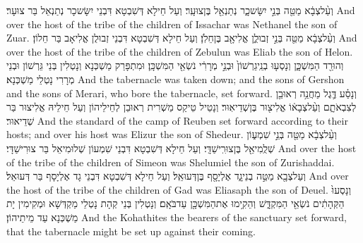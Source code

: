 {וְעַ֨ל\maqqaf צְבָ֔א מַטֵּ֖ה בְּנֵ֣י יִשָּׂשכָ֑ר נְתַנְאֵ֖ל בֶּן\maqqaf צוּעָֽר׃}
{וְעַל חֵילָא דְּשִׁבְטָא דִּבְנֵי יִשָּׂשכָר נְתַנְאֵל בַּר צוּעָר׃}
{And over the host of the tribe of the children of Issachar was Nethanel the son of Zuar.}{}
{וְעַ֨ל\maqqaf צְבָ֔א מַטֵּ֖ה בְּנֵ֣י זְבוּלֻ֑ן אֱלִיאָ֖ב בֶּן\maqqaf חֵלֹֽן׃}
{וְעַל חֵילָא דְּשִׁבְטָא דִּבְנֵי זְבוּלֻן אֱלִיאָב בַּר חֵלוֹן׃}
{And over the host of the tribe of the children of Zebulun was Eliab the son of Helon.}{}
{וְהוּרַ֖ד הַמִּשְׁכָּ֑ן וְנָסְע֤וּ בְנֵֽי\maqqaf גֵרְשׁוֹן֙ וּבְנֵ֣י מְרָרִ֔י נֹשְׂאֵ֖י הַמִּשְׁכָּֽן׃}
{וּמִתְפָּרַק מַשְׁכְּנָא וְנָטְלִין בְּנֵי גֵּרְשׁוֹן וּבְנֵי מְרָרִי נָטְלֵי מַשְׁכְּנָא׃}
{And the tabernacle was taken down; and the sons of Gershon and the sons of Merari, who bore the tabernacle, set forward.}{}
{וְנָסַ֗ע דֶּ֛גֶל מַחֲנֵ֥ה רְאוּבֵ֖ן לְצִבְאֹתָ֑ם וְעַ֨ל\maqqaf צְבָא֔וֹ אֱלִיצ֖וּר בֶּן\maqqaf שְׁדֵיאֽוּר׃}
{וְנָטֵיל טֵיקַס מַשְׁרִית רְאוּבֵן לְחֵילֵיהוֹן וְעַל חֵילֵיהּ אֱלִיצוּר בַּר שְׁדֵיאוּר׃}
{And the standard of the camp of Reuben set forward according to their hosts; and over his host was Elizur the son of Shedeur.}{}
{וְעַ֨ל\maqqaf צְבָ֔א מַטֵּ֖ה בְּנֵ֣י שִׁמְע֑וֹן שְׁלֻֽמִיאֵ֖ל בֶּן\maqqaf צוּרִֽישַׁדָּֽי׃}
{וְעַל חֵילָא דְּשִׁבְטָא דִּבְנֵי שִׁמְעוֹן שְׁלוּמִיאֵל בַּר צוּרִישַׁדָּי׃}
{And over the host of the tribe of the children of Simeon was Shelumiel the son of Zurishaddai.}{}
{וְעַל\maqqaf צְבָ֖א מַטֵּ֣ה בְנֵי\maqqaf גָ֑ד אֶלְיָסָ֖ף בֶּן\maqqaf דְּעוּאֵֽל׃}
{וְעַל חֵילָא דְּשִׁבְטָא דִּבְנֵי גָד אֶלְיָסָף בַּר דְּעוּאֵל׃}
{And over the host of the tribe of the children of Gad was Eliasaph the son of Deuel.}{}
{וְנָסְעוּ֙ הַקְּהָתִ֔ים נֹשְׂאֵ֖י הַמִּקְדָּ֑שׁ וְהֵקִ֥ימוּ אֶת\maqqaf הַמִּשְׁכָּ֖ן עַד\maqqaf בֹּאָֽם׃}
{וְנָטְלִין בְּנֵי קְהָת נָטְלֵי מַקְדְּשָׁא וּמְקִימִין יָת מַשְׁכְּנָא עַד מֵיתֵיהוֹן׃}
{And the Kohathites the bearers of the sanctuary set forward, that the tabernacle might be set up against their coming.}{}
